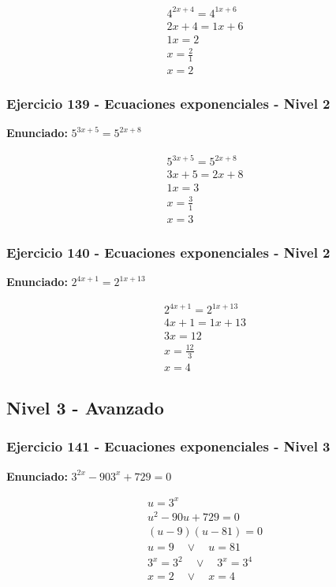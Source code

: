 \documentclass[12pt,a4paper]{article}
\begin{document}
\[
\begin{aligned}
4^{2x+4}=4^{1x+6}\\
2x+4=1x+6\\
1x=2\\
x=\frac{2}{1}\\
\boxed{x=2}
\end{aligned}
\]


\subsubsection*{Ejercicio 139 - Ecuaciones exponenciales - Nivel 2}
\textbf{Enunciado:} \(5^{3x+5}=5^{2x+8}\)

\[
\begin{aligned}
5^{3x+5}=5^{2x+8}\\
3x+5=2x+8\\
1x=3\\
x=\frac{3}{1}\\
\boxed{x=3}
\end{aligned}
\]


\subsubsection*{Ejercicio 140 - Ecuaciones exponenciales - Nivel 2}
\textbf{Enunciado:} \(2^{4x+1}=2^{1x+13}\)

\[
\begin{aligned}
2^{4x+1}=2^{1x+13}\\
4x+1=1x+13\\
3x=12\\
x=\frac{12}{3}\\
\boxed{x=4}
\end{aligned}
\]


\newpage

\subsection*{Nivel 3 - Avanzado}

\subsubsection*{Ejercicio 141 - Ecuaciones exponenciales - Nivel 3}
\textbf{Enunciado:} \(3^{2x}-903^x+729=0\)

\[
\begin{aligned}
u=3^x\\
u^2-90u+729=0\\
(u-9)(u-81)=0\\
u=9\quad \vee\quad u=81\\
3^x=3^{2}\quad \vee\quad 3^x=3^{4}\\
\boxed{x=2\quad \vee\quad x=4}
\end{aligned}
\]
\end{document}
